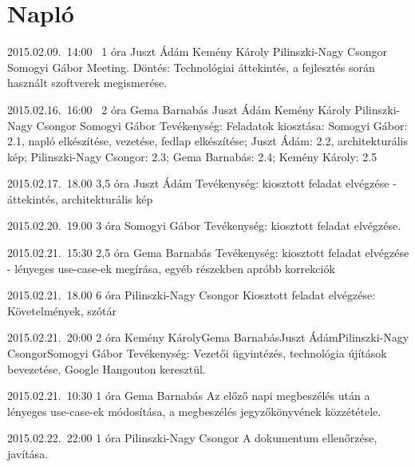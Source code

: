 %
\section{Napló}

\begin{naplo}

\bejegyzes
{2015.02.09.~14:00~} %
{1 óra} %
{Juszt Ádám\newline
Kemény Károly\newline
Pilinszki-Nagy Csongor\newline
Somogyi Gábor} %
{Meeting. Döntés: Technológiai áttekintés, a fejlesztés során használt szoftverek megismerése.} %

\bejegyzes
{2015.02.16.~16:00~}
{2 óra}
{Gema Barnabás\newline
	Juszt Ádám\newline
	Kemény Károly\newline
	Pilinszki-Nagy Csongor\newline
	Somogyi Gábor} %
{Tevékenység: Feladatok kiosztása: Somogyi Gábor: 2.1, napló elkészítése, vezetése, fedlap elkészítése; Juszt Ádám: 2.2, architekturális kép; Pilinszki-Nagy Csongor: 2.3; Gema Barnabás: 2.4; Kemény Károly: 2.5}

\bejegyzes
{2015.02.17.~18.00}
{3,5 óra}
{Juszt Ádám}
{Tevékenység: kiosztott feladat elvégzése - áttekintés, architekturális kép}

\bejegyzes
{2015.02.20.~19.00}
{3 óra}
{Somogyi Gábor}
{Tevékenység: kiosztott feladat elvégzése.}

\bejegyzes
{2015.02.21.~15:30}
{2,5 óra}
{Gema Barnabás}
{Tevékenység: kiosztott feladat elvégzése - lényeges use-case-ek megírása, egyéb részekben apróbb korrekciók}

\bejegyzes
{2015.02.21.~18.00}
{6 óra}
{Pilinszki-Nagy Csongor}
{Kiosztott feladat elvégzése: Követelmények, szótár}

\bejegyzes
{2015.02.21.~20:00}
{2 óra}
{Kemény Károly\newline Gema Barnabás\newline Juszt Ádám\newline Pilinszki-Nagy Csongor\newline Somogyi Gábor}
{Tevékenység: Vezetői ügyintézés, technológia újítások bevezetése, Google Hangouton keresztül.}

\bejegyzes
{2015.02.21.~10:30}
{1 óra}
{Gema Barnabás}
{Az előző napi megbeszélés után a lényeges use-case-ek módosítása, a megbeszélés jegyzőkönyvének közzététele.}

\bejegyzes
{2015.02.22.~22:00}
{1 óra}
{Pilinszki-Nagy Csongor}
{A dokumentum ellenőrzése, javítása.}


\end{naplo}

